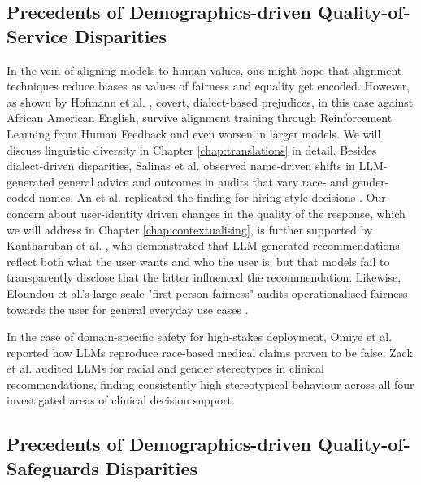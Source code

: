 \subsection{Precedents of Demographics-driven Quality-of-Service Disparities}

In the vein of aligning models to human values, one might hope that alignment techniques reduce biases as values of fairness and equality get encoded. However, as shown by Hofmann et al. \cite{hofmann2024ai-e4f}, covert, dialect-based prejudices, in this case against African American English, survive alignment training through Reinforcement Learning from Human Feedback and even worsen in larger models. We will discuss linguistic diversity in Chapter \ref{chap:translations} in detail. Besides dialect-driven disparities, Salinas et al. \cite{salinas2024name} observed name-driven shifts in LLM-generated general advice and outcomes in audits that vary race- and gender-coded names. An et al. replicated the finding for hiring-style decisions \cite{an-etal-2024-large}. Our concern about user-identity driven changes in the quality of the response, which we will address in Chapter \ref{chap:contextualising}, is further supported by Kantharuban et al. \cite{kantharuban-etal-2025-stereotype}, who demonstrated that LLM-generated recommendations reflect both what the user wants and who the user is, but that models fail to transparently disclose that the latter influenced the recommendation. Likewise, Eloundou et al.'s large-scale "first-person fairness" audits operationalised fairness towards the user for general everyday use cases \cite{eloundou2025firstperson}.

In the case of domain-specific safety for high-stakes deployment, Omiye et al. \cite{omiye2023racebased} reported how LLMs reproduce race-based medical claims proven to be false. Zack et al. \cite{zack2024assessing} audited LLMs for racial and gender stereotypes in clinical recommendations, finding consistently high stereotypical behaviour across all four investigated areas of clinical decision support.



\subsection{Precedents of Demographics-driven Quality-of-Safeguards Disparities}



